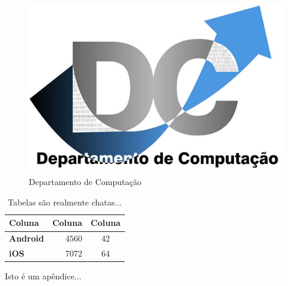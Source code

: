 \documentclass[a4paper,12pt,brazil,doubleside]{book}
\begin{document}
\begin{figure}[!htb]
  \centering
  \includegraphics[width=.5\textwidth]{../figuras/LogoDC.jpg}
  \caption{Departamento de Computação}
  \label{fig:dc}
\end{figure}

\begin{table}[!htb]
\caption{Tabelas são realmente chatas...}
\centering
\footnotesize
\begin{tabular}{lrc}
\hline
\textbf{Coluna} & \textbf{Coluna} & \textbf{Coluna} \\
\hline
\hline
\textbf{Android} & 4560 & 42 \\
\hline
\textbf{iOS} & 7072 & 64 \\
\hline
\end{tabular}
\label{tab:tabela}
\end{table}




\begin{singlespace}



\end{singlespace}



\singlespace
{}
\cleardoublepage
\thispagestyle{empty}
{}


\doublespace


\appendix
{} %

Isto é um apêndice...

\end{document}
